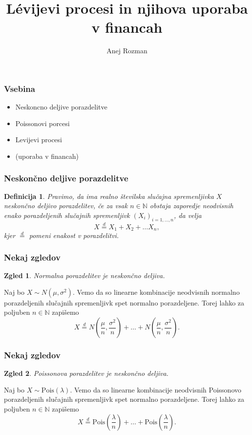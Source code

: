 \documentclass[]{beamer} %
\title{Lévijevi procesi in njihova uporaba v financah}
\subtitle{}
\author[Anej Rozman]{Anej Rozman}
\institute[]{Mentor: doc.~dr. Martin Raič}
\date[]{}
\theoremstyle{plain}
\newtheorem{definicija}{Definicija}
\newtheorem{zgled}{Zgled}
\begin{document}
\frame{\titlepage}

\begin{frame}
  \frametitle{Vsebina}
  \begin{itemize}
    \item <1-> Neskoncno deljive porazdelitve
    \item <2-> Poissonovi porcesi
    \item <3-> Levijevi procesi
    \item <4-> (uporaba v financah)
  \end{itemize}
\end{frame}


\begin{frame}
  \frametitle{Neskončno deljive porazdelitve}
  \begin{definicija}
    Pravimo, da ima realno številska slučajna spremenljivka $X$ \textit{neskončno deljivo porazdelitev}, če
    za vsak $n \in \mathbb{N}$ obstaja zaporedje neodvisnih enako porazdeljenih 
    slučajnih spremenljivk $(X_i)_{i=1,\dots,n}$, da velja 
    $$
    X \stackrel{d}{=} X_1 + X_2 + \dots X_n,
    $$
    kjer $\stackrel{d}{=}$ pomeni enakost v porazdelitvi.
\end{definicija}


  \end{frame}


\begin{frame}
  \frametitle{Nekaj zgledov}
  \begin{zgled}
    Normalna porazdelitev je neskončno deljiva.
  \end{zgled}
  \begin{center}
    Naj bo $X \sim N(\mu, \sigma^2)$. Vemo da so linearne kombinacije neodvisnih normalno 
    porazdeljenih slučajnih spremenljivk spet normalno porazdeljene. Torej lahko za poljuben 
    $n\in\mathbb{N}$ zapišemo
    $$
      X \stackrel{d}{=} N(\frac{\mu}{n}, \frac{\sigma^2}{n}) + \dots + N(\frac{\mu}{n}, \frac{\sigma^2}{n}).
    $$
  \end{center}
\end{frame}


\begin{frame}
  \frametitle{Nekaj zgledov}
  \begin{zgled}
    Poissonova porazdelitev je neskončno deljiva.
  \end{zgled}
  \begin{center}
    Naj bo $X \sim \text{Pois}(\lambda)$. Vemo da so linearne kombinacije neodvisnih Poissonovo
    porazdeljenih slučajnih spremenljivk spet normalno porazdeljene. Torej lahko za poljuben 
    $n\in\mathbb{N}$ zapišemo
    $$
      X \stackrel{d}{=} \text{Pois}(\frac{\lambda}{n}) + \dots + \text{Pois}(\frac{\lambda}{n}).
    $$
  \end{center}
\end{frame}
\end{document}
